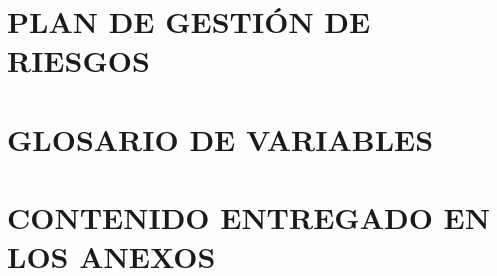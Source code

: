 \label{anexo:plan_de_gestion_de_riesgos}
\section*{PLAN DE GESTIÓN DE RIESGOS}


\newpage
\section*{GLOSARIO DE VARIABLES}
\label{anexo:glosario_variables}


\newpage
\section*{CONTENIDO ENTREGADO EN LOS ANEXOS} 
